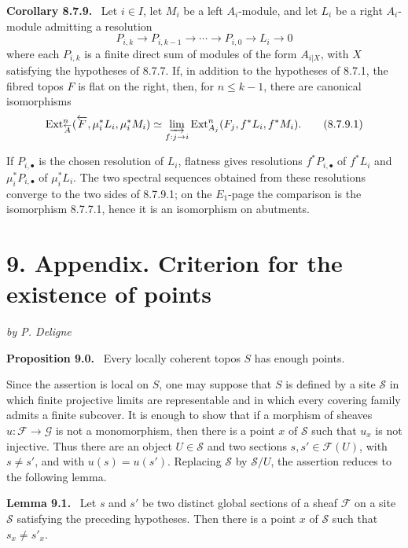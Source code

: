 \documentclass[11pt]{article}
\newcommand{\Ext}{\operatorname{Ext}}
\newenvironment{statement}[1]{\par\medskip\noindent\textbf{#1.}\ }{\par\medskip}
\begin{document}
\begin{statement}{Corollary 8.7.9}
Let \(i\in I\), let \(M_i\) be a left \(A_i\)-module, and let \(L_i\) be a right \(A_i\)-module admitting a resolution
\[
 P_{i,k}\to P_{i,k-1}\to\cdots\to P_{i,0}\to L_i\to0
\]
where each \(P_{i,k}\) is a finite direct sum of modules of the form \(A_{i|X}\), with \(X\) satisfying the hypotheses of 8.7.7. If, in addition to the hypotheses of 8.7.1, the fibred topos \(F\) is flat on the right, then, for \(n\le k-1\), there are canonical isomorphisms
\[
 \Ext^n_{\overleftarrow A}(\overleftarrow F,\mu_i^*L_i,\mu_i^*M_i)
 \simeq
 \varinjlim_{f:j\to i}\Ext^n_{A_j}(F_j,f^*L_i,f^*M_i). \tag{8.7.9.1}
\]
\end{statement}
If \(P_{i,\bullet}\) is the chosen resolution of \(L_i\), flatness gives resolutions \(f^*P_{i,\bullet}\) of \(f^*L_i\) and \(\mu_i^*P_{i,\bullet}\) of \(\mu_i^*L_i\). The two spectral sequences obtained from these resolutions converge to the two sides of 8.7.9.1; on the \(E_1\)-page the comparison is the isomorphism 8.7.7.1, hence it is an isomorphism on abutments.



\section*{9. Appendix. Criterion for the existence of points}
\begin{center}\emph{by P. Deligne}\end{center}

\begin{statement}{Proposition 9.0}
Every locally coherent topos \(S\) has enough points.
\end{statement}

Since the assertion is local on \(S\), one may suppose that \(S\) is defined by a site \(\mathscr S\) in which finite projective limits are representable and in which every covering family admits a finite subcover. It is enough to show that if a morphism of sheaves \(u:\mathcal F\to\mathcal G\) is not a monomorphism, then there is a point \(x\) of \(\mathscr S\) such that \(u_x\) is not injective. Thus there are an object \(U\in\mathscr S\) and two sections \(s,s'\in\mathcal F(U)\), with \(s\ne s'\), and with \(u(s)=u(s')\). Replacing \(\mathscr S\) by \(\mathscr S/U\), the assertion reduces to the following lemma.

\begin{statement}{Lemma 9.1}
Let \(s\) and \(s'\) be two distinct global sections of a sheaf \(\mathcal F\) on a site \(\mathscr S\) satisfying the preceding hypotheses. Then there is a point \(x\) of \(\mathscr S\) such that \(s_x\ne s'_x\).
\end{statement}
\end{document}
